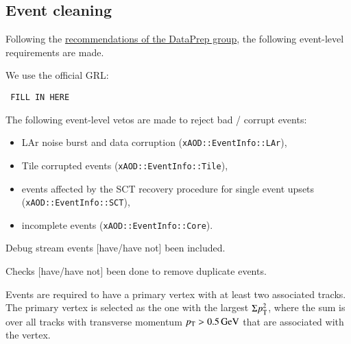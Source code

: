 \subsection{Event cleaning}
Following the \href{https://twiki.cern.ch/twiki/bin/viewauth/Atlas/DataPreparationCheckListForPhysicsAnalysis}{recommendations of the DataPrep group}, the following event-level requirements are made.

We use the official GRL\@:
 \begin{verbatim} FILL IN HERE \end{verbatim}
 
The following event-level vetos are made to reject bad / corrupt events:
 \begin{itemize}
  \item LAr noise burst and data corruption (\verb|xAOD::EventInfo::LAr|),
  \item Tile corrupted events (\verb|xAOD::EventInfo::Tile|),
  \item events affected by the SCT recovery procedure for single event upsets (\verb|xAOD::EventInfo::SCT|),
  \item incomplete events (\verb|xAOD::EventInfo::Core|).
 \end{itemize}
 
 Debug stream events [have/have not] been included.
 
 Checks [have/have not] been done to remove duplicate events.
 
Events are required to have a primary vertex with at least two associated tracks.
The primary vertex is selected as the one with the largest \(\Sigma p_{\text{T}}^2\),
where the sum is over all tracks with transverse momentum \(p_{\text{T}} > \SI{0.5}{\ensuremath{\text{GeV}}}\) that are associated with the vertex.
 
 